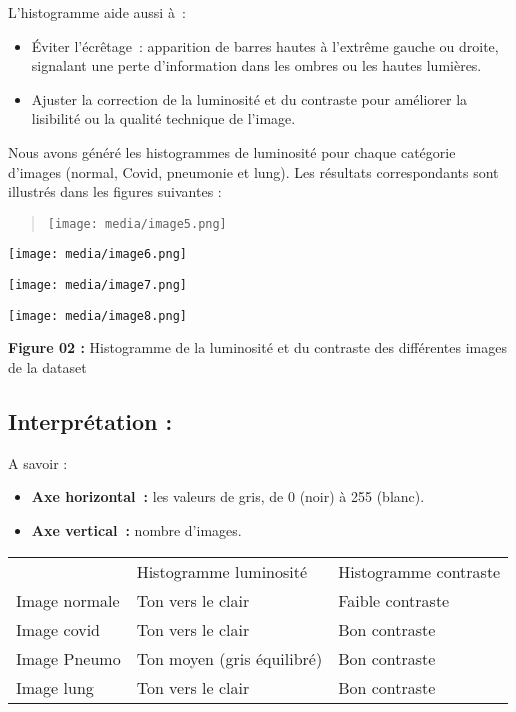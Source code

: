 L'histogramme aide aussi à~:

\begin{itemize}
\tightlist
\item
  Éviter l'écrêtage~: apparition de barres hautes à l'extrême gauche ou
  droite, signalant une perte d'information dans les ombres ou les
  hautes lumières.
\item
  Ajuster la correction de la luminosité et du contraste pour améliorer
  la lisibilité ou la qualité technique de l'image.
\end{itemize}

Nous avons généré les histogrammes de luminosité pour chaque catégorie
d'images (normal, Covid, pneumonie et lung). Les résultats
correspondants sont illustrés dans les figures suivantes :

\begin{quote}
\texttt{[image: media/image5.png]}
\end{quote}

\begin{quote}
\end{quote}

\begin{quote}
\end{quote}

\texttt{[image: media/image6.png]}

\texttt{[image: media/image7.png]}

\texttt{[image: media/image8.png]}

\textbf{Figure 02 : }Histogramme de la luminosité et du contraste des
différentes images de la dataset

\subsection[Interprétation
:]{\texorpdfstring{\protect\hypertarget{anchor-12}{}{}Interprétation
:}{Interprétation :}}\label{interpruxe9tation}

A savoir :

\begin{itemize}
\tightlist
\item
  \textbf{Axe horizontal~:} les\textbf{ }valeurs de gris, de 0 (noir) à
  255 (blanc).
\item
  \textbf{Axe vertical~: }nombre d'images.
\end{itemize}

\begin{longtable}[]{@{}lll@{}}
\toprule\noalign{}
\endhead
\bottomrule\noalign{}
\endlastfoot
& Histogramme luminosité & Histogramme contraste \\
Image normale & Ton vers le clair & Faible contraste \\
Image covid & Ton vers le clair & Bon contraste \\
Image Pneumo & Ton moyen (gris équilibré) & Bon contraste \\
Image lung & Ton vers le clair & Bon contraste \\
\end{longtable}

